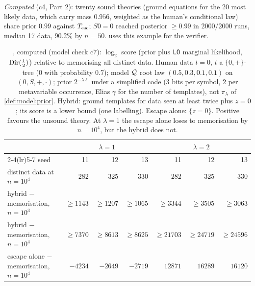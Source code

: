 \emph{Computed} (c4, Part 2): twenty sound theories (ground equations for the 20 most likely data, which carry mass $0.956$, weighted as the human's conditional law) share prior $0.99$ against $T_{\mathrm{esc}}$; $S0=0$ reached posterior $\ge0.99$ in 2000/2000 runs, median 17 data, 90.2\% by $n=50$.  uses this example for the verifier.

\begin{table}[ht]
\centering\small
\begin{tabular}{@{}lrrrrrr@{}}
\toprule
& \multicolumn{3}{c}{$\lambda=1$} & \multicolumn{3}{c}{$\lambda=2$}\\
\cmidrule(lr){2-4}\cmidrule(lr){5-7}
seed & 11 & 12 & 13 & 11 & 12 & 13\\
\midrule
distinct data at $n=10^4$ & 282 & 325 & 330 & 282 & 325 & 330\\
hybrid $-$ memorisation, $n=10^3$ & $\ge1143$ & $\ge1207$ & $\ge1065$ & $\ge3344$ & $\ge3505$ & $\ge3063$\\
hybrid $-$ memorisation, $n=10^4$ & $\ge7370$ & $\ge8613$ & $\ge8625$ & $\ge21703$ & $\ge24719$ & $\ge24596$\\
escape alone $-$ memorisation, $n=10^4$ & $-4234$ & $-2649$ & $-2719$ & $12871$ & $16289$ & $16120$\\
\bottomrule
\end{tabular}
\caption{, computed (model check c7): $\log_2$ score (prior plus $\mathord{\mathsf{L0}}$ marginal likelihood, $\mathrm{Dir}(\frac12)$) relative to memorising all distinct data. Human data $t=0$, $t$ a $\{0,+\}$-tree ($0$ with probability $0.7$); model $\mathcal{Q}$ root law $(0.5,0.3,0.1,0.1)$ on $(0,S,+,\cdot)$; prior $2^{-\lambda\ell}$ under a simplified code (3 bits per symbol, 2 per metavariable occurrence, Elias $\gamma$ for the number of templates), not $\pi_\lambda$ of \cref{def:model:prior}. Hybrid: ground templates for data seen at least twice plus $z=0$; its score is a lower bound (one labelling). Escape alone: $\{z=0\}$. Positive favours the unsound theory. At $\lambda=1$ the escape alone loses to memorisation by $n=10^4$, but the hybrid does not.}
\label{tab:ident:c7}
\end{table}

